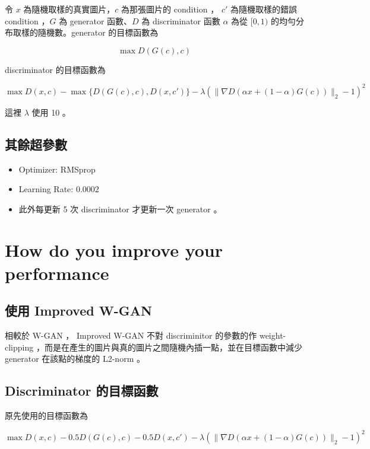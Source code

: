 \documentclass[fleqn,a4paper,12pt]{article}
\begin{document}
令 $x$ 為隨機取樣的真實圖片，$c$ 為那張圖片的 condition ， $c'$ 為隨機取樣的錯誤 condition ，$G$ 為 generator 函數、$D$ 為 discriminator 函數 $\alpha$ 為從 $[0, 1)$ 的均勻分布取樣的隨機數。generator 的目標函數為

\begin{equation*}
  \max D(G(c), c)
\end{equation*}

discriminator 的目標函數為

\begin{equation*}
  \max D(x, c) -\max\{D(G(c), c), D(x, c')\} - \lambda (\lVert \nabla D(\alpha x + (1 - \alpha) G(c)) \rVert_2 - 1)^2
\end{equation*}

這裡 $\lambda$ 使用 10 。

\subsection{其餘超參數}

\begin{itemize}
\item Optimizer: RMSprop
\item Learning Rate: $0.0002$
\item 此外每更新 5 次 discriminator 才更新一次 generator 。
\end{itemize}


\section{How do you improve your performance}

\subsection{使用 Improved W-GAN}

相較於 W-GAN ， Improved W-GAN 不對 discriminitor 的參數的作 weight-clipping ，而是在產生的圖片與真的圖片之間隨機內插一點，並在目標函數中減少 generator 在該點的梯度的 L2-norm 。

\subsection{Discriminator 的目標函數}

原先使用的目標函數為

\begin{equation*}
  \max D(x, c) - 0.5 D(G(c), c) - 0.5 D(x, c') - \lambda (\lVert \nabla D(\alpha x + (1 - \alpha) G(c)) \rVert_2 - 1)^2  
\end{equation*}
\end{document}
